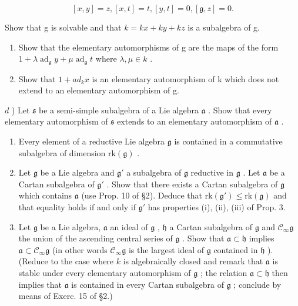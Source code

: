 \[
[ x, y ] = z, [ x, t ] = t, [ y, t ] = 0, [ \mathfrak {g}, z ] = 0.
\]

Show that g is solvable and that \(k = kx + ky + kz\) is a subalgebra of g.

\begin{enumerate}
\def\labelenumi{\alph{enumi})}
\setcounter{enumi}{1}
\item
  Show that the elementary automorphisms of g are the maps of the form \(1 + \lambda \operatorname{ad}_{\mathfrak{g}} y + \mu \operatorname{ad}_{\mathfrak{g}} t\) where \(\lambda, \mu \in k\) .
\item
  Show that \(1 + ad_{k}x\) is an elementary automorphism of k which does not extend to an elementary automorphism of g.
\end{enumerate}

\(d\) ) Let \(\mathfrak{s}\) be a semi-simple subalgebra of a Lie algebra \(\mathfrak{a}\) . Show that every elementary automorphism of \(\mathfrak{s}\) extends to an elementary automorphism of \(\mathfrak{a}\) .

\begin{enumerate}
\def\labelenumi{\arabic{enumi})}
\setcounter{enumi}{5}
\item
  Every element of a reductive Lie algebra \(\mathfrak{g}\) is contained in a commutative subalgebra of dimension \(\mathrm{rk}(\mathfrak{g})\) .
\item
  Let \(\mathfrak{g}\) be a Lie algebra and \(\mathfrak{g}'\) a subalgebra of \(\mathfrak{g}\) reductive in \(\mathfrak{g}\) . Let \(\mathfrak{a}\) be a Cartan subalgebra of \(\mathfrak{g}'\) . Show that there exists a Cartan subalgebra of \(\mathfrak{g}\) which contains \(\mathfrak{a}\) (use Prop. 10 of §2). Deduce that \(\mathrm{rk}(\mathfrak{g}') \leq \mathrm{rk}(\mathfrak{g})\) and that equality holds if and only if \(\mathfrak{g}'\) has properties (i), (ii), (iii) of Prop. 3.
\item
  Let \(\mathfrak{g}\) be a Lie algebra, \(\mathfrak{a}\) an ideal of \(\mathfrak{g}\) , \(\mathfrak{h}\) a Cartan subalgebra of \(\mathfrak{g}\) and \(\mathcal{C}_{\infty}\mathfrak{g}\) the union of the ascending central series of \(\mathfrak{g}\) . Show that \(\mathfrak{a} \subset \mathfrak{h}\) implies \(\mathfrak{a} \subset \mathcal{C}_{\infty}\mathfrak{g}\) (in other words \(\mathcal{C}_{\infty}\mathfrak{g}\) is the largest ideal of \(\mathfrak{g}\) contained in \(\mathfrak{h}\) ). (Reduce to the case where \(k\) is algebraically closed and remark that \(\mathfrak{a}\) is stable under every elementary automorphism of \(\mathfrak{g}\) ; the relation \(\mathfrak{a} \subset \mathfrak{h}\) then implies that \(\mathfrak{a}\) is contained in every Cartan subalgebra of \(\mathfrak{g}\) ; conclude by means of Exerc. 15 of §2.)
\end{enumerate}

